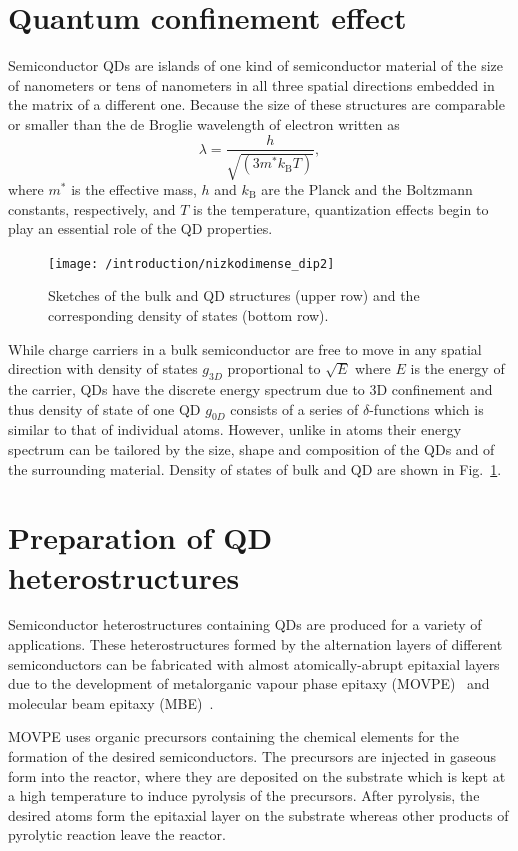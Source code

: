 \documentclass[
a4paper, %
11pt, %
onecolumn, %
openany, %
oldfontcommands,
]{memoir}
\begin{document}
\section{Quantum confinement effect}
Semiconductor QDs are islands of one kind of semiconductor material of the size of nanometers or tens of nanometers in all three spatial directions embedded in the matrix of a different one. Because the size of these structures are comparable or smaller than the de Broglie wavelength of electron written as
\begin{equation}
\lambda=\frac{h}{\sqrt{(3m^*k_\mathrm{B}T)}},
\end{equation}
where $m^*$ is the effective mass, $h$ and $k_\mathrm{B}$ are the Planck and the Boltzmann constants, respectively, and $T$ is the temperature, quantization effects begin to play an essential role of the QD properties.


%
\begin{figure}
	\centering
	\texttt{[image: /introduction/nizkodimense\_dip2]}
	\caption{Sketches of the bulk and QD structures (upper row) and the corresponding density of states (bottom row).}
	\label{fig:intr:nizkodimenze}
\end{figure}
%
While charge carriers in a bulk semiconductor are free to move in any spatial direction with density of states $g_{3D}$ proportional to $\sqrt{E}$ where $E$ is the energy of the carrier, QDs have the discrete energy spectrum due to 3D confinement and thus density of state of one QD $g_{0D}$ consists of a series of $\delta$-functions which is similar to that of individual atoms. However, unlike in atoms their energy spectrum can be tailored by the size, shape and composition of the QDs and of the surrounding material. Density of states of bulk and QD are shown in Fig.~\ref{fig:intr:nizkodimenze}.

\section{Preparation of QD heterostructures}
Semiconductor heterostructures containing QDs are produced for a variety of applications. These heterostructures formed by the alternation layers of different semiconductors can be fabricated with almost atomically-abrupt epitaxial layers due to the development of metalorganic vapour phase epitaxy (MOVPE)~\cite{Stringfellow,MOVPE_May} and molecular beam epitaxy (MBE)~\cite{Stringfellow,MOVPE_May}.

MOVPE uses organic precursors containing the chemical elements for the formation of the desired semiconductors. The precursors are injected in gaseous form into the reactor, where they are deposited on the substrate which is kept at a high temperature to induce pyrolysis of the precursors. After pyrolysis, the desired atoms form the epitaxial layer on the substrate whereas other products of pyrolytic reaction leave the reactor.
\end{document}

